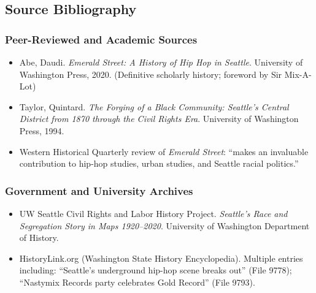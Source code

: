 \documentclass[11pt,letterpaper]{article}
\begin{document}
\subsection{Source Bibliography}

\subsubsection{Peer-Reviewed and Academic Sources}
\begin{itemize}[noitemsep]
  \item Abe, Daudi. \textit{Emerald Street: A History of Hip Hop in Seattle}. University of Washington Press, 2020. (Definitive scholarly history; foreword by Sir Mix-A-Lot)
  \item Taylor, Quintard. \textit{The Forging of a Black Community: Seattle's Central District from 1870 through the Civil Rights Era}. University of Washington Press, 1994.
  \item Western Historical Quarterly review of \textit{Emerald Street}: ``makes an invaluable contribution to hip-hop studies, urban studies, and Seattle racial politics.''
\end{itemize}

\subsubsection{Government and University Archives}
\begin{itemize}[noitemsep]
  \item UW Seattle Civil Rights and Labor History Project. \textit{Seattle's Race and Segregation Story in Maps 1920--2020}. University of Washington Department of History.
  \item HistoryLink.org (Washington State History Encyclopedia). Multiple entries including: ``Seattle's underground hip-hop scene breaks out'' (File 9778); ``Nastymix Records party celebrates Gold Record'' (File 9793).
\end{itemize}
\end{document}
